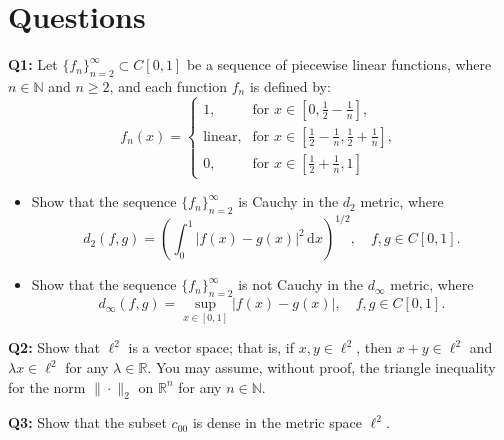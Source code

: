\documentclass{article}
\newcommand{\N}{{\mathbb{N}}}
\newcommand{\R}{{\mathbb{R}}}
\begin{document}
\section{Questions}

\textbf{Q1:} Let $\{f_n\}_{n=2}^\infty \subset C[0,1]$ be a sequence of piecewise linear functions, where $n\in\mathbb{N}$ and $n\geq 2$, and each function $f_n$ is defined by:
\[
f_n(x) = \begin{cases}
    1, & \text{for } x \in \left[0, \frac{1}{2} - \frac{1}{n} \right], \\
    \text{linear}, & \text{for } x \in \left[ \frac{1}{2} - \frac{1}{n}, \frac{1}{2} + \frac{1}{n} \right], \\
    0, & \text{for } x \in \left[ \frac{1}{2} + \frac{1}{n}, 1 \right]
\end{cases}
\]

\begin{itemize}
    \item Show that the sequence $\{f_n\}_{n=2}^\infty$ is Cauchy in the $d_2$ metric, where
    \[
    d_2(f,g) = \left( \int_0^1 |f(x) - g(x)|^2 \, \mathrm{d}x \right)^{1/2}, \quad f, g \in C[0,1].
    \]
    \item Show that the sequence $\{f_n\}_{n=2}^\infty$ is not Cauchy in the $d_\infty$ metric, where
    \[
    d_\infty(f,g) = \sup_{x \in [0,1]} |f(x) - g(x)|, \quad f, g \in C[0,1].
    \]
\end{itemize}

\textbf{Q2:} Show that $\ell^2$ is a vector space; that is, if $x, y \in \ell^2$, then $x + y \in \ell^2$ and $\lambda x \in \ell^2$ for any $\lambda \in \mathbb{R}$. You may assume, without proof, the triangle inequality for the norm $\| \cdot \|_2$ on $\R^n$ for any $n\in \N$.

\textbf{Q3:} Show that the subset $c_{00}$ is dense in the metric space $\ell^2$.
\end{document}
